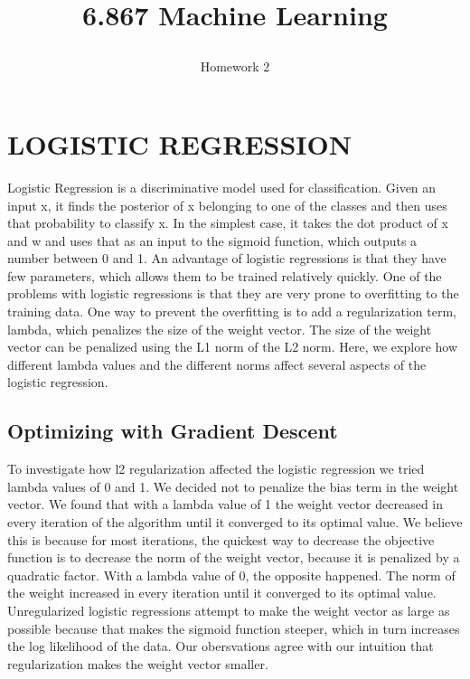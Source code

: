 \documentclass[a4paper,twoside]{article}
\begin{document}
\title{6.867 Machine Learning  \subtitle{Homework 2} }

\maketitle


\section{\uppercase{Logistic Regression}}

\noindent Logistic Regression is a discriminative model used for classification. Given an input x, it finds the posterior of x belonging to one of the classes and then uses that probability to classify x. In the simplest case, it takes the dot product of x and w and uses that as an input to the sigmoid function, which outputs a number between 0 and 1. An advantage of logistic regressions is that they have few parameters, which allows them to be trained relatively quickly. One of the problems with logistic regressions is that they are very prone to overfitting to the training data. One way to prevent the overfitting is to add a regularization term, lambda, which penalizes the size of the weight vector. The size of the weight vector can be penalized using the L1 norm of the L2 norm. Here, we explore how different lambda values and the different norms affect several aspects of the logistic regression.

\subsection{Optimizing with Gradient Descent}

\noindent To investigate how l2 regularization affected the logistic regression we tried lambda values of 0 and 1. We decided not to penalize the bias term in the weight vector. We found that with a lambda value of 1 the weight vector decreased in every iteration of the algorithm until it converged to its optimal value. We believe this is because for most iterations, the quickest way to decrease the objective function is to decrease the norm of the weight vector, because it is penalized by a quadratic factor. With a lambda value of 0, the opposite happened. The norm of the weight increased in every iteration until it converged to its optimal value. Unregularized logistic regressions attempt to make the weight vector as large as possible because that makes the sigmoid function steeper, which in turn increases the log likelihood of the data. Our obersvations agree with our intuition that regularization makes the weight vector smaller.
\end{document}
